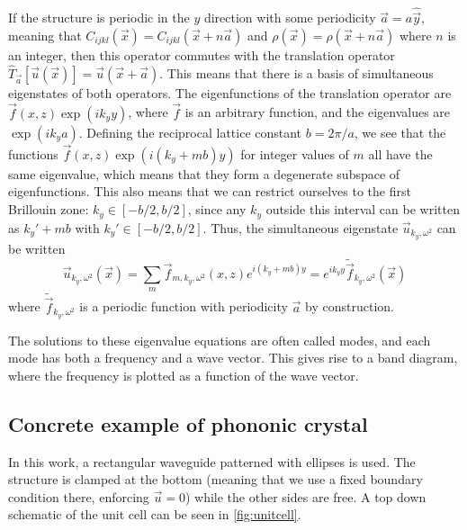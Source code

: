 If the structure is periodic in the $y$ direction with some periodicity
$\vec a = a \hat{\vec y}$,
meaning that $C_{ijkl}(\vec x) = C_{ijkl}(\vec x + n \vec a)$ and $\rho(\vec x)
= \rho(\vec x + n \vec a)$ where $n$ is an
integer, then this operator commutes with the translation operator
$\hat T_{\vec a}[\vec u(\vec x)] = \vec u(\vec x + \vec a)$.
This means that there is a basis of simultaneous eigenstates of both operators.
The eigenfunctions of the translation operator are
$\vec f(x, z)\exp(i k_y y)$, where $\vec f$ is an arbitrary function,
and the eigenvalues are $\exp(i k_y a)$.
Defining the reciprocal lattice constant $b = 2 \pi / a$, we see
that the functions $\vec f(x, z) \exp(i (k_y + m b) y)$ for integer values
of $m$ all have the same eigenvalue, which means that they form a degenerate
subspace of eigenfunctions.
This also means that we can restrict ourselves to the first Brillouin zone:
$k_y \in [-b/2, b/2]$,
since any $k_y$ outside this interval can be written as $k_y' + mb$ with
$k_y' \in [-b/2, b/2]$.
Thus, the simultaneous eigenstate $\vec u_{k_y, \omega^2}$ can be written
\begin{equation}
	\vec u_{k_y, \omega^2}(\vec x) = \sum_m \vec f_{m,k_y,\omega^2}(x, z) e^{i (k_y + m b) y}
	= e^{i k_y y} \tilde{\vec f}_{k_y, \omega^2}(\vec x)
\end{equation}
where $\tilde{\vec f}_{k_y, \omega^2}$ is a periodic function with periodicity
$\vec a$ by construction.

The solutions to these eigenvalue equations are often called modes, and each
mode has both a frequency and a wave vector. This gives rise to a band diagram,
where the frequency is plotted as a function of the wave vector.

\subsection{Concrete example of phononic crystal}

In this work, a rectangular waveguide patterned with ellipses is used.
The structure is clamped at the bottom (meaning that we use a fixed boundary
condition there, enforcing $\vec u = 0$) while the other sides are free.
A top down schematic of the unit cell can be seen in \cref{fig:unitcell}.

